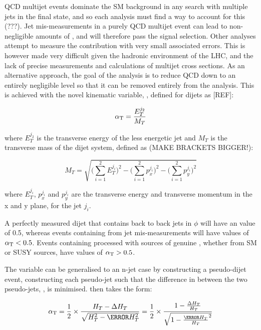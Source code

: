 QCD multijet events dominate the SM background in any search with multiple jets 
in the final state, and 
so each analysis must find a way to account for this (???). Jet mis-measurements in a 
purely QCD multijet event can lead to non-negligible amounts of \mht, and will 
therefore pass the signal selection. 
Other analyses attempt
to measure the contribution with very small associated errors. This is however 
made very difficult given the hadronic environment of the LHC, and the lack of 
precise measurements and calculations of multijet cross sections. As an 
alternative approach, the goal of the 
\alphat analysis is to reduce QCD down to an entirely negligible level so that 
it can be removed entirely from the analysis. This is 
achieved with the novel kinematic variable, \alphat, defined for dijets as [REF]:

\begin{equation}
\alpha_{\text{T}} = \frac{E_T^{j_2}}{M_T}
\label{eq:alphat_dijet}
\end{equation}

where $E_T^{j_2}$ is the transverse energy of the less energetic jet and $M_T$ 
is the transverse mass of the dijet system, defined as (MAKE BRACKETS BIGGER!):

\begin{equation}
M_T = \sqrt{\bigg(\sum^2_{i=1}{E_T^{j_i}}\bigg)^2 - \bigg(\sum^2_{i=1}{p_x^{j_i}}\bigg)^2 - \bigg(\sum^2_{i=1}{p_y^{j_i}}\bigg)^2}
\label{eq:mt}
\end{equation}

where $E_T^{j_i}$, $p_x^{j_i}$ and $p_y^{j_i}$ are the transverse energy and 
transverse momentum in the x and y plane, for the jet $j_i$.

A perfectly measured dijet that contains back to back jets in $\phi$ will have an
\alphat value of 0.5, whereas 
events containing \mht from jet mis-measurements will have values of $\alpha_{\text{T}}<0.5$.
Events
containing processed with sources of genuine \met, whether from SM or SUSY 
sources, have values of $\alpha_{\text{T}} > 0.5$. 

The \alphat variable can be generalised to an n-jet case by constructing a 
pseudo-dijet event, constructing each pseudo-jet such that the difference in \HT
between the two pseudo-jets, \deltaHT, is minimised. \alphat then takes the 
form:

\begin{equation}
\alphat = \frac{1}{2} \times \frac{\HT-\deltaHT}{\sqrt{\HT^2 - \mht^2}} = 
\frac{1}{2} \times \frac{1-\frac{\deltaHT}{\HT}}{\sqrt{1 - \frac{\mht}{\HT}^2}}
\label{eq:alphat_njet}
\end{equation}

